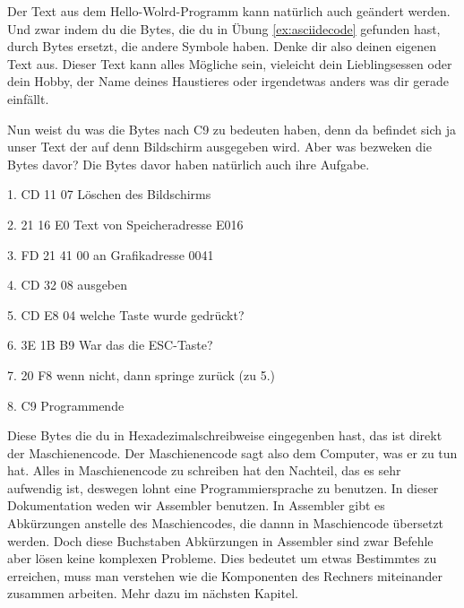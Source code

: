 \documentclass[10pt]{book}
\begin{document}
\begin{Exercise}[label=ex:asciiencode]
Der Text aus dem Hello-Wolrd-Programm
kann natürlich auch ge\-än\-dert werden.
Und zwar indem du die Bytes,
die du in Übung \ref{ex:asciidecode} gefunden hast,
durch Bytes ersetzt, die andere Symbole haben.
Denke dir also deinen eigenen Text aus.
Dieser Text kann alles Mögliche sein,
vieleicht dein Lieblingsessen oder dein Hobby,
der Name deines Haustieres
oder irgendetwas anders was dir gerade einfällt.
\end{Exercise}

Nun weist du was die Bytes nach C9 zu bedeuten haben,
denn da befindet sich ja unser Text der auf denn Bildschirm ausgegeben wird.
Aber was bezweken die Bytes davor? Die Bytes davor haben natürlich auch ihre Aufgabe.

1. CD 11 07		Löschen des Bildschirms

2. 21 16 E0		Text von Speicheradresse E016

3. FD 21 41 00		an Grafikadresse 0041

4. CD 32 08		ausgeben

5. CD E8 04		welche Taste wurde gedrückt?

6. 3E 1B B9		War das die ESC-Taste?

7. 20 F8		wenn nicht, dann springe zurück (zu 5.)

8. C9			Programmende


Diese Bytes die du in Hexadezimalschreibweise
eingegenben hast, das ist direkt der Maschienencode.
Der Maschienencode sagt also dem Computer,
was er zu tun hat. Alles in Maschienencode zu schreiben
hat den Nachteil, das es sehr aufwendig ist,
deswegen lohnt eine Programmiersprache zu benutzen.
In dieser Dokumentation weden wir Assembler benutzen.
In Assembler gibt es Abkürzungen
anstelle des Maschiencodes,
die dannn in Maschiencode übersetzt werden.
Doch diese Buchstaben Abkürzungen in Assembler
sind zwar Befehle aber lösen keine komplexen Probleme.
Dies bedeutet um etwas Bestimmtes zu erreichen,
muss man verstehen wie die Komponenten
des Rechners miteinander zusammen arbeiten.
Mehr dazu im nächsten Kapitel.
\end{document}
